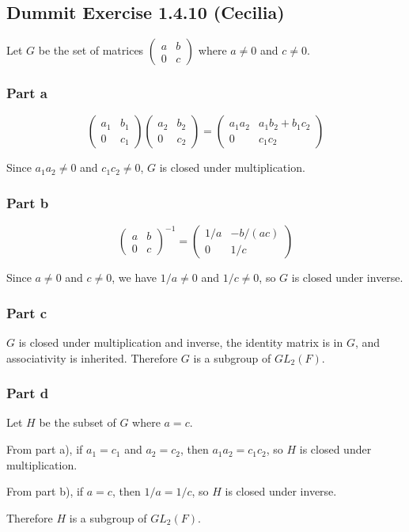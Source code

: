 \subsection*{Dummit Exercise 1.4.10 (Cecilia)}

Let $G$ be the set of matrices $\begin{pmatrix} a & b \\ 0 & c \end{pmatrix}$ where $a \ne 0$ and $c \ne 0$.

\subsubsection*{Part a}

\[
  \begin{pmatrix} a_1 & b_1 \\ 0 & c_1 \end{pmatrix}
  \begin{pmatrix} a_2 & b_2 \\ 0 & c_2 \end{pmatrix}
  =
  \begin{pmatrix} a_1 a_2 & a_1 b_2 + b_1 c_2 \\ 0 & c_1 c_2 \end{pmatrix}
\]

Since $a_1 a_2 \ne 0$ and $c_1 c_2 \ne 0$, $G$ is closed under multiplication.

\subsubsection*{Part b}

\[
  \begin{pmatrix} a & b \\ 0 & c \end{pmatrix}^{-1}
  =
  \begin{pmatrix} 1/a & -b/(ac) \\ 0 & 1/c \end{pmatrix}
\]

Since $a \ne 0$ and $c \ne 0$, we have $1/a \ne 0$ and $1/c \ne 0$, so $G$ is closed under inverse.

\subsubsection*{Part c}

$G$ is closed under multiplication and inverse, the identity matrix is in $G$, and associativity is inherited. Therefore $G$ is a subgroup of $GL_2(F)$.

\subsubsection*{Part d}

Let $H$ be the subset of $G$ where $a = c$.

From part a), if $a_1 = c_1$ and $a_2 = c_2$, then $a_1 a_2 = c_1 c_2$, so $H$ is closed under multiplication.

From part b), if $a = c$, then $1/a = 1/c$, so $H$ is closed under inverse.

Therefore $H$ is a subgroup of $GL_2(F)$.
